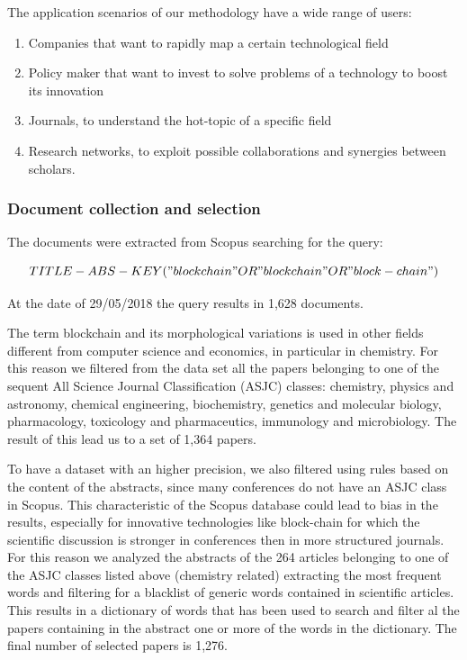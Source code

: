 \documentclass[b5paper,]{book}
\providecommand{\tightlist}{%
  \setlength{\itemsep}{0pt}\setlength{\parskip}{0pt}}
\theoremstyle{definition}
\theoremstyle{definition}
\theoremstyle{definition}
\theoremstyle{remark}
\begin{document}
The application scenarios of our methodology have a wide range of users:

\begin{enumerate}
\def\labelenumi{\arabic{enumi}.}
\tightlist
\item
  Companies that want to rapidly map a certain technological field
\item
  Policy maker that want to invest to solve problems of a technology to
  boost its innovation
\item
  Journals, to understand the hot-topic of a specific field
\item
  Research networks, to exploit possible collaborations and synergies
  between scholars.
\end{enumerate}

\subsubsection*{Document collection and
selection}\label{document-collection-and-selection}

The documents were extracted from Scopus searching for the query:

\begin{equation*} 
  TITLE-ABS-KEY("blockchain" OR "block chain" OR "block-chain")
\end{equation*}

At the date of 29/05/2018 the query results in 1,628 documents.

The term blockchain and its morphological variations is used in other
fields different from computer science and economics, in particular in
chemistry. For this reason we filtered from the data set all the papers
belonging to one of the sequent All Science Journal Classification
(ASJC) classes: chemistry, physics and astronomy, chemical engineering,
biochemistry, genetics and molecular biology, pharmacology, toxicology
and pharmaceutics, immunology and microbiology. The result of this lead
us to a set of 1,364 papers.

To have a dataset with an higher precision, we also filtered using rules
based on the content of the abstracts, since many conferences do not
have an ASJC class in Scopus. This characteristic of the Scopus database
could lead to bias in the results, especially for innovative
technologies like block-chain for which the scientific discussion is
stronger in conferences then in more structured journals. For this
reason we analyzed the abstracts of the 264 articles belonging to one of
the ASJC classes listed above (chemistry related) extracting the most
frequent words and filtering for a blacklist of generic words contained
in scientific articles. This results in a dictionary of words that has
been used to search and filter al the papers containing in the abstract
one or more of the words in the dictionary. The final number of selected
papers is 1,276.
\end{document}
